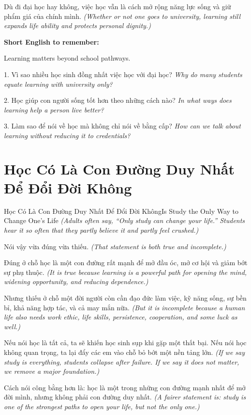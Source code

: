 \begin{baihoc}
Dù đi đại học hay không, việc học vẫn là cách mở rộng năng lực sống và giữ phẩm giá của chính mình.
\textit{(Whether or not one goes to university, learning still expands life ability and protects personal dignity.)}
\end{baihoc}

\begin{ghinhoanh}
\textbf{Short English to remember:}

Learning matters beyond school pathways.

\end{ghinhoanh}

\begin{tuhocnhanh}
1. Vì sao nhiều học sinh đồng nhất việc học với đại học? \textit{Why do many students equate learning with university only?}

2. Học giúp con người sống tốt hơn theo những cách nào? \textit{In what ways does learning help a person live better?}

3. Làm sao để nói về học mà không chỉ nói về bằng cấp? \textit{How can we talk about learning without reducing it to credentials?}
\end{tuhocnhanh}
\ngancach

\section{Học Có Là Con Đường Duy Nhất Để Đổi Đời Không}
\begin{truyen}{Học Có Là Con Đường Duy Nhất Để Đổi Đời Không}{Is Study the Only Way to Change One's Life}
\textit{(Adults often say, “Only study can change your life.” Students hear it so often that they partly believe it and partly feel crushed.)}

Nói vậy vừa đúng vừa thiếu.
\textit{(That statement is both true and incomplete.)}

Đúng ở chỗ học là một con đường rất mạnh để mở đầu óc, mở cơ hội và giảm bớt sự phụ thuộc.
\textit{(It is true because learning is a powerful path for opening the mind, widening opportunity, and reducing dependence.)}

Nhưng thiếu ở chỗ một đời người còn cần đạo đức làm việc, kỹ năng sống, sự bền bỉ, khả năng hợp tác, và cả may mắn nữa.
\textit{(But it is incomplete because a human life also needs work ethic, life skills, persistence, cooperation, and some luck as well.)}

Nếu nói học là tất cả, ta sẽ khiến học sinh sụp khi gặp một thất bại. Nếu nói học không quan trọng, ta lại đẩy các em vào chỗ bỏ bớt một nền tảng lớn.
\textit{(If we say study is everything, students collapse after failure. If we say it does not matter, we remove a major foundation.)}

Cách nói công bằng hơn là: học là một trong những con đường mạnh nhất để mở đời mình, nhưng không phải con đường duy nhất.
\textit{(A fairer statement is: study is one of the strongest paths to open your life, but not the only one.)}
\end{truyen}

